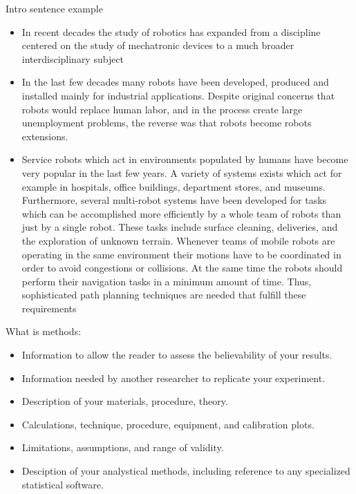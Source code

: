 Intro sentence example
\begin{itemize}
    \item In recent decades the study of robotics has expanded from a discipline centered on the study of mechatronic devices to a much broader interdisciplinary subject
    \item In the last few decades many robots have been developed, produced and installed mainly for industrial applications. Despite original concerns that robots would replace human labor, and in the process create large unemployment problems, the reverse was that robots become robots extensions.
    \item Service robots which act in environments populated by humans have become very popular in the last few years. A variety of systems exists which act for example in hospitals, office buildings, department stores, and museums. Furthermore, several multi-robot systems have been developed for tasks which can be accomplished more efficiently by a whole team of robots than just by a single robot.  These tasks include surface cleaning, deliveries, and the exploration of unknown terrain. Whenever teams of mobile robots are operating in the same environment their motions have to be coordinated in order to avoid congestions or collisions.  At the same time the robots should perform their navigation tasks in a minimum amount of time. Thus, sophisticated path planning techniques are needed that fulfill these requirements
\end{itemize}


What is methods:
\begin{itemize}
    \item Information to allow the reader to assess the believability of your results.
    \item Information needed by another researcher to replicate your experiment.
    \item Description of your materials, procedure, theory.
    \item Calculations, technique, procedure, equipment, and calibration plots.
    \item Limitations, assumptions, and range of validity.
    \item Desciption of your analystical methods, including reference to any specialized statistical software.
\end{itemize}

